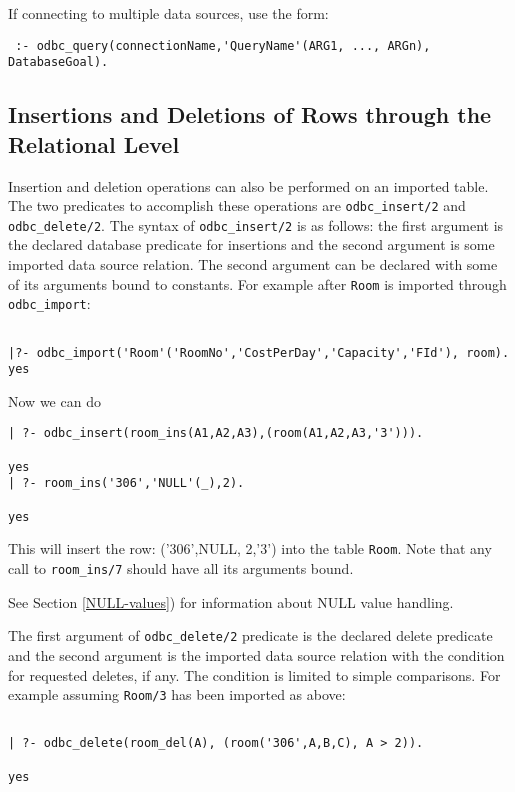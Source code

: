 If connecting to multiple data sources, use the form:
\begin{verbatim}
 :- odbc_query(connectionName,'QueryName'(ARG1, ..., ARGn), DatabaseGoal).
\end{verbatim}


\subsection{Insertions and Deletions of Rows through the Relational Level}

Insertion and deletion operations can also be performed on an imported
table.  The two predicates to accomplish these operations are 
{\tt odbc\_insert/2} and {\tt odbc\_delete/2}.  The syntax of 
{\tt odbc\_insert/2} is as follows: the first argument is the declared 
database predicate for insertions and the second argument
is some imported data source relation.  The second argument can be 
declared with some of its arguments bound to constants.  For example 
after {\tt Room} is imported through {\tt odbc\_import}:
\begin{verbatim}

|?- odbc_import('Room'('RoomNo','CostPerDay','Capacity','FId'), room).
yes 
\end{verbatim}

Now we can do

\begin{verbatim}
| ?- odbc_insert(room_ins(A1,A2,A3),(room(A1,A2,A3,'3'))).

yes
| ?- room_ins('306','NULL'(_),2).

yes
\end{verbatim}
This will insert the row: ('306',NULL, 2,'3') into the table {\tt Room}. Note that 
any call to {\tt room\_ins/7} should have all its arguments bound.

See Section \ref{NULL-values}) for information about NULL value
handling.

The first argument of {\tt odbc\_delete/2} predicate is the declared delete
predicate and the second argument is the imported data source relation
with the condition for requested deletes, if any.  The condition is
limited to simple comparisons.  For example assuming
{\tt Room/3} has been imported as above:
\begin{verbatim}

| ?- odbc_delete(room_del(A), (room('306',A,B,C), A > 2)). 

yes
\end{verbatim}

